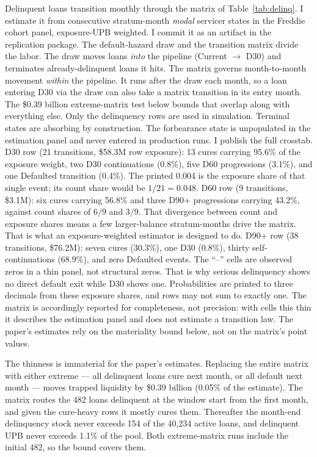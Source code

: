 \documentclass[12pt]{article}
\begin{document}
Delinquent loans transition monthly through the matrix of Table~\ref{tab:delinq}. I estimate it from consecutive stratum-month \emph{modal} servicer states in the Freddie cohort panel, exposure-UPB weighted. I commit it as an artifact in the replication package. The default-hazard draw and the transition matrix divide the labor. The draw moves loans \emph{into} the pipeline (Current $\to$ D30) and terminates already-delinquent loans it hits. The matrix governs month-to-month movement \emph{within} the pipeline. It runs after the draw each month, so a loan entering D30 via the draw can also take a matrix transition in its entry month. The \$0.39 billion extreme-matrix test below bounds that overlap along with everything else. Only the delinquency rows are used in simulation. Terminal states are absorbing by construction. The forbearance state is unpopulated in the estimation panel and never entered in production runs.
I publish the full crosstab. D30 row (21 transitions, \$58.3M row exposure): 13 cures carrying 95.6\% of the exposure weight, two D30 continuations (0.8\%), five D60 progressions (3.1\%), and one Defaulted transition (0.4\%). The printed 0.004 is the exposure share of that single event; its count share would be $1/21 = 0.048$. D60 row (9 transitions, \$3.1M): six cures carrying 56.8\% and three D90+ progressions carrying 43.2\%, against count shares of $6/9$ and $3/9$. That divergence between count and exposure shares means a few larger-balance stratum-months drive the matrix. That is what an exposure-weighted estimator is designed to do. D90+ row (38 transitions, \$76.2M): seven cures (30.3\%), one D30 (0.8\%), thirty self-continuations (68.9\%), and zero Defaulted events. The ``--'' cells are observed zeros in a thin panel, not structural zeros. That is why serious delinquency shows no direct default exit while D30 shows one. Probabilities are printed to three decimals from these exposure shares, and rows may not sum to exactly one. The matrix is accordingly reported for completeness, not precision: with cells this thin it describes the estimation panel and does not estimate a transition law. The paper's estimates rely on the materiality bound below, not on the matrix's point values.

The thinness is immaterial for the paper's estimates. Replacing the entire matrix with either extreme --- all delinquent loans cure next month, or all default next month --- moves trapped liquidity by \$0.39 billion (0.05\% of the estimate). The matrix routes the 482 loans delinquent at the window start from the first month, and given the cure-heavy rows it mostly cures them. Thereafter the month-end delinquency stock never exceeds 154 of the 40,234 active loans, and delinquent UPB never exceeds 1.1\% of the pool. Both extreme-matrix runs include the initial 482, so the bound covers them.
\end{document}
